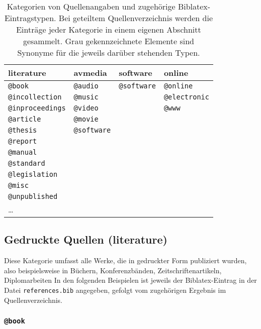 \begin{table}
\caption{Kategorien von Quellenangaben und zugehörige Biblatex-Eintragstypen.
Bei geteiltem Quellenverzeichnis werden die Einträge jeder Kategorie in einem
eigenen Abschnitt gesammelt. Grau gekennzeichnete Elemente sind Synonyme für
die jeweils darüber stehenden Typen.}
\label{tab:BibKategorien}
\centering
{}
\setlength{\tabcolsep}{4mm}
\begin{tabular}{@{}llll@{}}
	\toprule
	\textsf{literature} & \textsf{avmedia} & \textsf{software} & \textsf{online} \\
	\midrule
	\texttt{@book} & \texttt{@audio} & \texttt{@software} & \texttt{@online} \\
	\texttt{@incollection} & \texttt{\color{midgray}@music} & & \texttt{\color{midgray}@electronic} \\
	\texttt{@inproceedings} & \texttt{@video} & & \texttt{\color{midgray}@www} \\
	\texttt{@article} & \texttt{@movie} & & \\
	\texttt{@thesis} & \texttt{@software} & & \\
	\texttt{@report} & & & \\
	\texttt{@manual} & & & \\
	\texttt{@standard} & & & \\
	\texttt{@legislation} & & & \\
	\texttt{@misc} & & &  \\
	\texttt{@unpublished} &  & & \\
	\ldots & & & \\
	\bottomrule
\end{tabular}
\end{table}



\subsection{Gedruckte Quellen (\textsf{literature})}
\label{sec:KategorieLiterature}

Diese Kategorie umfasst alle Werke, die in gedruckter Form publiziert wurden,
also beispielsweise in Büchern, Konferenzbänden, Zeitschriftenartikeln,
Diplomarbeiten \usw In den folgenden Beispielen ist jeweils der
Biblatex-Eintrag in der Datei \nolinkurl{references.bib} angegeben, gefolgt
vom zugehörigen Ergebnis im Quellenverzeichnis.


\subsubsection{\texttt{\bfseries @book}}
\label{sec:@book}

